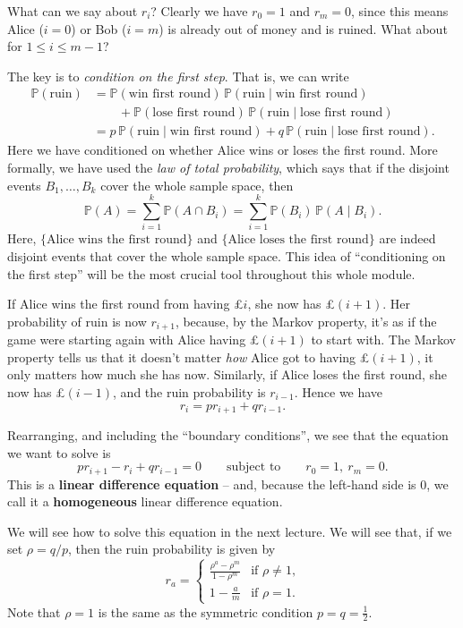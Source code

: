 \documentclass[
  a4paper,
]{article}
\theoremstyle{definition}
\theoremstyle{definition}
\theoremstyle{definition}
\theoremstyle{remark}
\begin{document}
What can we say about \(r_i\)? Clearly we have \(r_0 = 1\) and \(r_m = 0\), since this means Alice (\(i=0\)) or Bob (\(i=m\)) is already out of money and is ruined. What about for \(1 \leq i \leq m-1\)?

The key is to \emph{condition on the first step}. That is, we can write
\begin{align*}
\mathbb P(\text{ruin}) &= \mathbb P(\text{win first round}) \, \mathbb P(\text{ruin} \mid \text{win first round}) \\
&\qquad{}+ \mathbb P(\text{lose first round}) \, \mathbb P(\text{ruin} \mid \text{lose first round}) \\
&= p\,\mathbb P(\text{ruin} \mid \text{win first round}) + q \,\mathbb P(\text{ruin} \mid \text{lose first round}) .
\end{align*}
Here we have conditioned on whether Alice wins or loses the first round. More formally, we have used the \emph{law of total probability}, which says that if the disjoint events \(B_1, \dots, B_k\) cover the whole sample space, then
\[ \mathbb P(A) = \sum_{i=1}^k \mathbb P(A \cap B_i) = \sum_{i=1}^k \mathbb P(B_i) \, \mathbb P(A \mid B_i) . \]
Here, \(\{\text{Alice wins the first round}\}\) and \(\{\text{Alice loses the first round}\}\) are indeed disjoint events that cover the whole sample space. This idea of ``conditioning on the first step'' will be the most crucial tool throughout this whole module.

If Alice wins the first round from having £\(i\), she now has £\((i+1)\). Her probability of ruin is now \(r_{i+1}\), because, by the Markov property, it's as if the game were starting again with Alice having £\((i+1)\) to start with. The Markov property tells us that it doesn't matter \emph{how} Alice got to having £\((i+1)\), it only matters how much she has now. Similarly, if Alice loses the first round, she now has £\((i-1)\), and the ruin probability is \(r_{i-1}\). Hence we have
\[ r_i = pr_{i+1} + qr_{i-1}. \]

Rearranging, and including the ``boundary conditions'', we see that the equation we want to solve is
\[ pr_{i+1} - r_i + qr_{i-1} = 0 \qquad \text{subject to} \qquad r_0 = 1,\ r_m = 0. \]
This is a \textbf{linear difference equation} -- and, because the left-hand side is \(0\), we call it a \textbf{homogeneous} linear difference equation.

We will see how to solve this equation in the next lecture. We will see that, if we set \(\rho = q/p\), then the ruin probability is given by
\[ r_a = \begin{cases} \displaystyle\frac{\rho^a - \rho^m}{1 - \rho^m} & \text{if $\rho \neq 1$,} \\[0.35cm]
           1 - \displaystyle\frac{a}{m} & \text{if $\rho = 1$.} \end{cases} \]
Note that \(\rho = 1\) is the same as the symmetric condition \(p = q = \frac12\).
\end{document}
